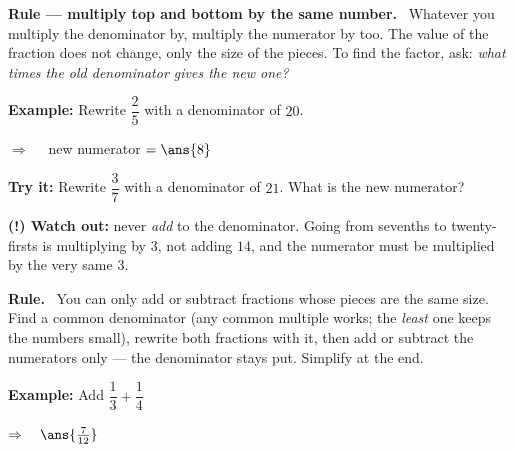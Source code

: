 \documentclass[12pt]{article}
\begin{document}


\begin{formulabox}
\textbf{Rule --- multiply top and bottom by the same number.} \ Whatever you multiply the denominator by, multiply the numerator by too. The value of the fraction does not change, only the size of the pieces. To find the factor, ask: \emph{what times the old denominator gives the new one?}
\end{formulabox}

\begin{examplebox}
\textbf{Example:} \quad Rewrite $\dfrac{2}{5}$ with a denominator of $20$.


$\Rightarrow\quad$ new numerator $= \ans{8}$
\end{examplebox}

\begin{tryitbox}
\textbf{Try it:} \quad Rewrite $\dfrac{3}{7}$ with a denominator of $21$. What is the new numerator?\\[2pt]
\end{tryitbox}

\begin{watchoutbox}
\textbf{(!) Watch out:} never \emph{add} to the denominator. Going from sevenths to twenty-firsts is multiplying by $3$, not adding $14$, and the numerator must be multiplied by the very same $3$.
\end{watchoutbox}


\begin{formulabox}
\textbf{Rule.} \ You can only add or subtract fractions whose pieces are the same size. Find a common denominator (any common multiple works; the \emph{least} one keeps the numbers small), rewrite both fractions with it, then add or subtract the numerators only --- the denominator stays put. Simplify at the end.
\end{formulabox}

\begin{examplebox}
\textbf{Example:} \quad Add $\dfrac{1}{3} + \dfrac{1}{4}$


$\Rightarrow\quad \ans{\tfrac{7}{12}}$
\end{examplebox}
\end{document}
